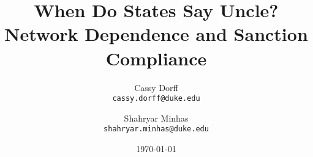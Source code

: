 \documentclass[12pt]{article}
\title{When Do States Say Uncle? Network Dependence and Sanction Compliance}
\author{	Cassy Dorff \\
	\texttt{cassy.dorff@duke.edu}
	\and
	Shahryar Minhas \\
	\texttt{shahryar.minhas@duke.edu}}
\date{\today}
\begin{document}
\maketitle

\begin{abstract}



\end{abstract}

\newpage















\newpage


\end{document}
